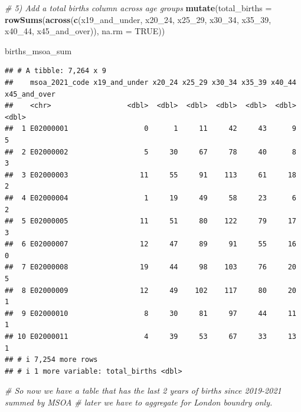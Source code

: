 \documentclass[
]{article}
\newenvironment{Shaded}{\begin{snugshade}}{\end{snugshade}}
\newcommand{\AttributeTok}[1]{\textcolor[rgb]{0.13,0.29,0.53}{#1}}
\newcommand{\CommentTok}[1]{\textcolor[rgb]{0.56,0.35,0.01}{\textit{#1}}}
\newcommand{\ConstantTok}[1]{\textcolor[rgb]{0.56,0.35,0.01}{#1}}
\newcommand{\FunctionTok}[1]{\textcolor[rgb]{0.13,0.29,0.53}{\textbf{#1}}}
\newcommand{\NormalTok}[1]{#1}
\newcommand{\StringTok}[1]{\textcolor[rgb]{0.31,0.60,0.02}{#1}}
\begin{document}
\begin{Shaded}
\begin{Highlighting}[]
  \CommentTok{\# 5) Add a total births column across age groups}
  \FunctionTok{mutate}\NormalTok{(}\AttributeTok{total\_births =} \FunctionTok{rowSums}\NormalTok{(}\FunctionTok{across}\NormalTok{(}\FunctionTok{c}\NormalTok{(}\StringTok{\textasciigrave{}}\AttributeTok{x19\_and\_under}\StringTok{\textasciigrave{}}\NormalTok{, }\StringTok{\textasciigrave{}}\AttributeTok{x20\_24}\StringTok{\textasciigrave{}}\NormalTok{, }\StringTok{\textasciigrave{}}\AttributeTok{x25\_29}\StringTok{\textasciigrave{}}\NormalTok{, }\StringTok{\textasciigrave{}}\AttributeTok{x30\_34}\StringTok{\textasciigrave{}}\NormalTok{, }\StringTok{\textasciigrave{}}\AttributeTok{x35\_39}\StringTok{\textasciigrave{}}\NormalTok{, }\StringTok{\textasciigrave{}}\AttributeTok{x40\_44}\StringTok{\textasciigrave{}}\NormalTok{, }\StringTok{\textasciigrave{}}\AttributeTok{x45\_and\_over}\StringTok{\textasciigrave{}}\NormalTok{)), }\AttributeTok{na.rm =} \ConstantTok{TRUE}\NormalTok{))}

\NormalTok{births\_msoa\_sum}
\end{Highlighting}
\end{Shaded}

\begin{verbatim}
## # A tibble: 7,264 x 9
##    msoa_2021_code x19_and_under x20_24 x25_29 x30_34 x35_39 x40_44 x45_and_over
##    <chr>                  <dbl>  <dbl>  <dbl>  <dbl>  <dbl>  <dbl>        <dbl>
##  1 E02000001                  0      1     11     42     43      9            5
##  2 E02000002                  5     30     67     78     40      8            3
##  3 E02000003                 11     55     91    113     61     18            2
##  4 E02000004                  1     19     49     58     23      6            2
##  5 E02000005                 11     51     80    122     79     17            3
##  6 E02000007                 12     47     89     91     55     16            0
##  7 E02000008                 19     44     98    103     76     20            5
##  8 E02000009                 12     49    102    117     80     20            1
##  9 E02000010                  8     30     81     97     44     11            1
## 10 E02000011                  4     39     53     67     33     13            1
## # i 7,254 more rows
## # i 1 more variable: total_births <dbl>
\end{verbatim}

\begin{Shaded}
\begin{Highlighting}[]
\CommentTok{\# So now we have a table that has the last 2 years of births since 2019{-}2021 summed by MSOA}
\CommentTok{\# later we have to aggregate for London boundry only. }
\end{Highlighting}
\end{Shaded}
\end{document}
